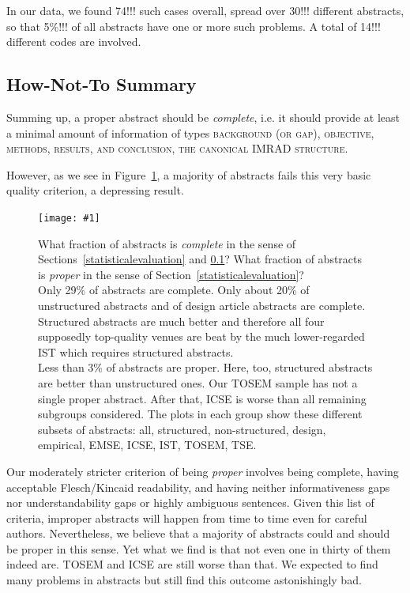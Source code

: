 \documentclass[10pt,journal,compsoc]{IEEEtran}
\newcommand{\Plot}[2]{%
	\begin{figure}[htb]%
		\centering\texttt{[image: \#1]}%
		\vspace{-4mm}\caption{#2}\label{#1}%
	\end{figure}}
\newcommand{\Cb}[1]{\bgroup\scshape #1\egroup}  %
\newcommand{\Describegroups}{The plots in each group show these different subsets of abstracts:
	all, structured, non-structured, design, empirical, EMSE, ICSE, IST, TOSEM, TSE.}
\begin{document}
In our data, we found 74!!! such cases overall, spread over 30!!! different abstracts,
so that 5\%!!! of all abstracts have one or more such problems.
A total of 14!!! different codes are involved.


\subsection{How-Not-To Summary}\label{hownotto_summary}

Summing up, a proper abstract should be \emph{complete}, i.e. it should provide at least 
a minimal amount of information of types  \Cb{background} (\Cb{or gap}),
\Cb{objective}, \Cb{methods}, \Cb{results}, and \Cb{conclusion}, the
canonical IMRAD structure.

However, as we see in Figure~\ref{nonzerofractionbar_xletgroups_totalqualityfractions},
a majority of abstracts fails this very basic quality criterion, a depressing result.

	
\Plot{nonzerofractionbar_xletgroups_totalqualityfractions}{%
	What fraction of abstracts is \emph{complete} in the sense of 
	Sections~\ref{statisticalevaluation} and \ref{hownotto_summary}?
	What fraction of abstracts is \emph{proper} in the sense of 
	Section~\ref{statisticalevaluation}?\\
    Only 29\% of abstracts are complete. 
	Only about 20\% of unstructured abstracts and of design article abstracts are complete.
	Structured abstracts are much better and therefore all four supposedly top-quality venues
	are beat by the much lower-regarded IST which requires structured abstracts.\\
	Less than 3\% of abstracts are proper.
	Here, too, structured abstracts are better than unstructured ones.
	Our TOSEM sample has not a single proper abstract.
	After that, ICSE is worse than all remaining subgroups considered.
	\Describegroups}

Our moderately stricter criterion of being \emph{proper} involves 
being complete, having acceptable Flesch/Kincaid readability,
and having neither informativeness gaps nor understandability gaps or highly ambiguous sentences.
Given this list of criteria, improper abstracts will happen from time to time
even for careful authors.
Nevertheless, we believe that a majority of abstracts could and should be proper in this sense.
Yet what we find is that not even one in thirty of them indeed are.
TOSEM and ICSE are still worse than that.
We expected to find many problems in abstracts but still find this outcome astonishingly bad. 
\end{document}
